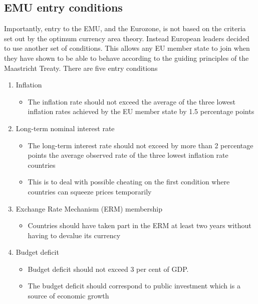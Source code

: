 \documentclass{tufte-handout}
\begin{document}
\subsection{EMU entry conditions}
Importantly, entry to the EMU, and the Eurozone, is not based on the criteria set out by the optimum currency area theory. 
Instead European leaders decided to use another set of conditions.
This allows any EU member state to join when they have shown to be able to behave according to the guiding principles of the Maastricht Treaty. 
There are five entry conditions
\begin{enumerate}
	\item Inflation
	\begin{itemize}
	  \item The inflation rate should not exceed the average of the three lowest inflation rates achieved by the EU member state by 1.5 percentage points
	\end{itemize}

	\item Long-term nominal interest rate
	\begin{itemize}
	  \item The long-term interest rate should not exceed by more than 2 percentage points the average observed rate of the three lowest inflation rate countries
	  \item This is to deal with possible cheating on the first condition where countries can squeeze prices temporarily
	\end{itemize}

	\item Exchange Rate Mechanism (ERM) membership
	\begin{itemize}
	  \item Countries should have taken part in the ERM at least two years without having to devalue its currency 
	\end{itemize}

	\item Budget deficit
	\begin{itemize}
	  \item Budget deficit should not exceed 3 per cent of GDP.
	  \item The budget deficit should correspond to public investment which is a source of economic growth
	\end{itemize}


\end{enumerate}
\end{document}
